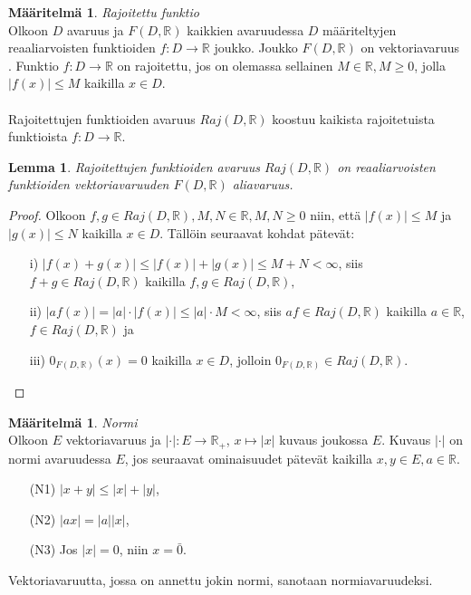 \documentclass[12pt,a4paper,leqno]{report}
\newcommand{\R}{\mathbb{R}}
\theoremstyle{plain}
\newtheorem{lem}[equation]{Lemma}
\theoremstyle{definition}
\newtheorem{maar}[equation]{Määritelmä}
\theoremstyle{remark}
\begin{document}
\begin{maar}
\emph{Rajoitettu funktio}\\
Olkoon $D$ avaruus ja $F(D,\R)$ kaikkien avaruudessa $D$ määriteltyjen 
reaaliarvoisten funktioiden $f\colon D\rightarrow \R$ joukko. Joukko $F(D,\R)$ on vektoriavaruus \cite{Topo1}. %
Funktio $f\colon D\rightarrow \R$ on rajoitettu, 
jos on olemassa sellainen $M\in\R,M\geq 0$, 
jolla $|f(x)|\leq M$ kaikilla $x\in D$.\\\\
Rajoitettujen funktioiden avaruus $Raj(D,\R )$ koostuu kaikista rajoitetuista funktioista $f\colon D\rightarrow \R $.

\end{maar}
\begin{lem}
Rajoitettujen funktioiden avaruus $Raj(D,\R )$ on reaaliarvoisten funktioiden vektoriavaruuden $F(D,\R)$ aliavaruus.
\end{lem}
\begin{proof}
 Olkoon $f,g\in Raj(D,\R),M,N\in\R, M,N\geq 0$ niin, että $|f(x)|\leq M$ ja ${|g(x)|\leq N}$ kaikilla $x\in D$. Tällöin seuraavat kohdat pätevät: 
\begin{itemize}
\item[i)\phantom{iiv}] $|f(x)+g(x)|\leq|f(x)|+|g(x)|\leq M+N<\infty$, siis $f+g\in Raj(D,\R)$ kaikilla $f,g\in Raj(D,\R),$
\item[ii)\phantom{iv}] $|af(x)|= |a|\cdot|f(x)|\leq |a|\cdot M<\infty$, siis $af\in Raj(D,\R)$ kaikilla $a\in\R$, ${f\in Raj(D,\R)}$ ja
\item[iii)\phantom{v}] $0_{F(D,\R)}(x)=0$ kaikilla $x\in D$, jolloin $0_{F(D,\R)} \in Raj(D,\R )$.
\end{itemize}
\end{proof}

\begin{maar} \emph{Normi}\\
Olkoon $E$ vektoriavaruus ja $|\cdot|\colon E\rightarrow \R_+$, $x\mapsto|x|$ kuvaus joukossa $E$. %
Kuvaus $|\cdot|$ on normi avaruudessa $E$, jos seuraavat ominaisuudet pätevät kaikilla $ x,y\in E, a\in\R$.
\begin{itemize}
\item[(N1)]$|x+y|\leq |x|+|y|$,
\item[(N2)]$|ax|=|a||x|$,
\item[(N3)]Jos $|x|=0$, niin $x=\bar{0}$.
\end{itemize} 
Vektoriavaruutta, jossa on annettu jokin normi, sanotaan normiavaruudeksi.

\end{maar} 
\end{document}
